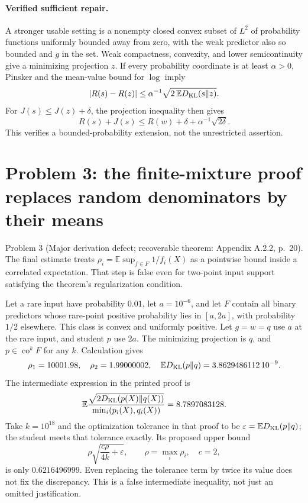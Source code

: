 \documentclass[10pt]{article}
\begin{document}
\paragraph*{Verified sufficient repair.}\mbox{}\par
A stronger usable setting is a nonempty closed convex subset of \(L^2\) of probability functions uniformly bounded away from zero, with the weak predictor also so bounded and \(g\) in the set. Weak compactness, convexity, and lower semicontinuity give a minimizing projection \(z\). If every probability coordinate is at least \(\alpha>0\), Pinsker and the mean-value bound for \(\log\) imply \[|R(s)-R(z)|\leq\alpha^{-1}\sqrt{2\,\mathbb E D_{\rm KL}(s\|z)}.\] For \(J(s)\leq J(z)+\delta\), the projection inequality then gives \[R(s)+J(s)\leq R(w)+\delta+\alpha^{-1}\sqrt{2\delta}.\] This verifies a bounded-probability extension, not the unrestricted assertion.\par
\section*{Problem 3: the finite-mixture proof replaces random denominators by their means}
Problem 3 (Major derivation defect; recoverable theorem: Appendix A.2.2, p. 20).  The final estimate treats \(\rho_i=\mathbb E\sup_{f\in F}1/f_i(X)\) as a pointwise bound inside a correlated expectation. That step is false even for two-point input support satisfying the theorem’s regularization condition.\par
Let a rare input have probability \(0.01\), let \(a=10^{-6}\), and let \(F\) contain all binary predictors whose rare-point positive probability lies in \([a,2a]\), with probability \(1/2\) elsewhere. This class is convex and uniformly positive. Let \(g=w=q\) use \(a\) at the rare input, and student \(p\) use \(2a\). The minimizing projection is \(q\), and \(p\in\operatorname{co}^kF\) for any \(k\). Calculation gives \[\rho_1=10001.98,\quad \rho_2=1.99000002,\quad
 \mathbb E D_{\rm KL}(p\|q)=3.8629486112\,10^{-9}.\] The intermediate expression in the printed proof is \[\mathbb E\frac{\sqrt{2D_{\rm KL}(p(X)\|q(X))}}
                   {\min_i(p_i(X),q_i(X))}
   =8.7897083128.\] Take \(k=10^{18}\) and the optimization tolerance in that proof to be \(\varepsilon=\mathbb E D_{\rm KL}(p\|q)\); the student meets that tolerance exactly. Its proposed upper bound \[\rho\sqrt{\frac{c\rho}{4k}+\varepsilon},
 \qquad \rho=\max_i\rho_i,\quad c=2,\] is only \(0.6216496999\). Even replacing the tolerance term by twice its value does not fix the discrepancy. This is a false intermediate inequality, not just an omitted justification.\par
\end{document}
